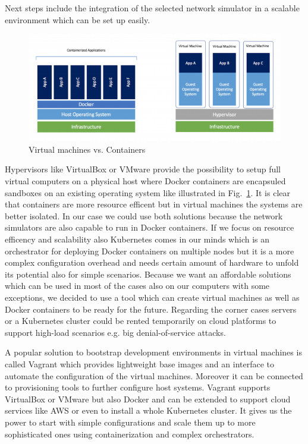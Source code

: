 \documentclass[conference]{IEEEtran}
\begin{document}
Next steps include the integration of the selected network simulator in a scalable environment which can be set up easily. 

\begin{figure}[htbp]
\centerline{\includegraphics[scale=0.25]{docker_vm.png}}
\caption{Virtual machines vs. Containers \cite{b8}}
\label{docker-vm}
\end{figure}

Hypervisors like VirtualBox or VMware provide the possibility to setup full virtual computers on a physical host where Docker containers are encapsuled sandboxes on an existing operating system like illustrated in Fig.~\ref{docker-vm}. It is clear that containers are more resource efficent but in virtual machines the systems are better isolated. In our case we could use both solutions because the network simulators are also capable to run in Docker containers. If we focus on resource efficency and scalability also Kubernetes comes in our minds which is an orchestrator for deploying Docker containers on multiple nodes but it is a more complex configuration overhead and needs certain amount of hardware to unfold its potential also for simple scenarios. Because we want an affordable solutions which can be used in most of the cases also on our computers with some exceptions, we decided to use a tool which can create virtual machines as well as Docker containers to be ready for the future. Regarding the corner cases servers or a Kubernetes cluster could be rented temporarily on cloud platforms to support high-load scenarios e.g. big denial-of-service attacks.

A popular solution to bootstrap development environments in virtual machines is called Vagrant which provides lightweight base images and an interface to automate the configuration of the virtual machines. Moreover it can be connected to provisioning tools to further configure host systems. Vagrant supports VirtualBox or VMware but also Docker and can be extended to support cloud services like AWS or even to install a whole Kubernetes cluster. It gives us the power to start with simple configurations and scale them up to more sophisticated ones using containerization and complex orchestrators. \cite{b9}
\end{document}
